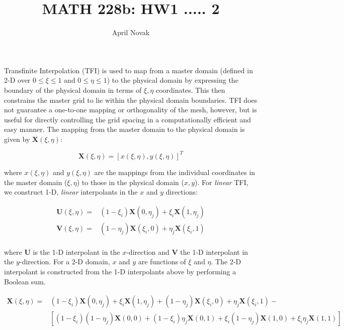 \documentclass[10pt]{article}
\begin{document}
\title{MATH 228b: HW1 ..... 2}
\author{April Novak}

\maketitle

\section{}

Transfinite Interpolation (TFI) is used to map from a master domain (defined in 2-D over \(0\leq\xi\leq1\) and \(0\leq\eta\leq1\)) to the physical domain by expressing the boundary of the physical domain in terms of \(\xi,\eta\) coordinates. This then constrains the master grid to lie within the physical domain boundaries. TFI does not guarantee a one-to-one mapping or orthogonality of the mesh, however, but is useful for directly controlling the grid spacing in a computationally efficient and easy manner. The mapping from the master domain to the physical domain is given by \(\textbf{X}(\xi,\eta)\):

\begin{equation}
\textbf{X}(\xi,\eta)=\left\lbrack x(\xi,\eta), y(\xi,\eta)\right\rbrack^T
\end{equation}

where \(x(\xi,\eta)\) and \(y(\xi,\eta)\) are the mappings from the individual coordinates in the master domain (\(\xi,\eta\)) to those in the physical domain (\(x,y\)). For \textit{linear} TFI, we construct 1-D, \textit{linear} interpolants in the \(x\) and \(y\) directions:

\begin{equation}
\begin{aligned}
\textbf{U}(\xi,\eta)=& (1-\xi_i)\textbf{X}(0,\eta_j)+\xi_i\textbf{X}(1,\eta_j)\\
\textbf{V}(\xi,\eta)=& (1-\eta_j)\textbf{X}(\xi_i,0)+\eta_j\textbf{X}(\xi_i,1)\\
\end{aligned}
\end{equation}

where \(\textbf{U}\) is the 1-D interpolant in the \(x\)-direction and \(\textbf{V}\) the 1-D interpolant in the \(y\)-direction. For a 2-D domain, \(x\) and \(y\) are functions of \(\xi\) and \(\eta\). The 2-D interpolant is constructed from the 1-D interpolants above by performing a Boolean sum.

\begin{equation}
\begin{aligned}
\textbf{X}(\xi,\eta)=& (1-\xi_i)\textbf{X}(0,\eta_j)+\xi_i\textbf{X}(1,\eta_j) + (1-\eta_j)\textbf{X}(\xi_i,0)+\eta_j\textbf{X}(\xi_i,1) - \\
& \left\lbrack(1-\xi_i)(1-\eta_j)\textbf{X}(0,0)+(1-\xi_i)\eta_j\textbf{X}(0,1)+\xi_i(1-\eta_j)\textbf{X}(1,0)+\xi_i\eta_j\textbf{X}(1,1)\right\rbrack
\end{aligned}
\end{equation}
\end{document}
